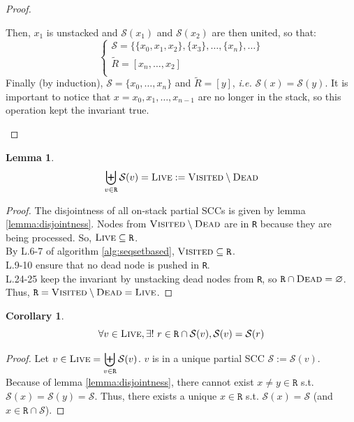 \documentclass[a4 paper, 12pt]{article}
\newtheorem{lemma}{Lemma}
\newtheorem{corollary}{Corollary}[lemma]
\begin{document}
\begin{proof}
\begin{itemize}
        Then, $x_1$ is unstacked and $\mathcal{S}(x_1)$ and $\mathcal{S}(x_2)$ are then united, so that:
        \begin{equation*}
            \left\{
                    \begin{array}{l}
                        \mathcal{S} = \{\{x_0, x_1, x_2\}, \{x_3\}, \ldots, \{x_n\}, \ldots\}\\
                        \widetilde{R} = [x_n, \ldots, x_2]\\
                    \end{array}
                \right.
        \end{equation*}
        Finally (by induction), $\mathcal{S} = \{x_0, \ldots, x_n\}$ and $\widetilde{R} = [y]$, \textit{i.e.} $\mathcal{S}(x)=\mathcal{S}(y)$. It is important to notice that $x=x_0, x_1, \ldots, x_{n-1}$ are no longer in the stack, so this operation kept the invariant true.
    \end{itemize}
\end{proof}

\begin{lemma}
    \begin{equation*}
        \biguplus_{v \in \texttt{R}} \mathcal{S}(v) = \textsc{Live} := \textsc{Visited} \setminus \textsc{Dead}
    \end{equation*}
\end{lemma}

\begin{proof}
    The disjointness of all on-stack partial SCCs is given by lemma \ref{lemma:disjointness}. Nodes from $\textsc{Visited} \setminus \textsc{Dead}$ are in \texttt{R} because they are being processed. So, $\textsc{Live} \subseteq \texttt{R}$.\\
    By L.6-7 of algorithm \ref{alg:seqsetbased}, $\textsc{Visited} \subseteq \texttt{R}$.\\
    L.9-10 ensure that no dead node is pushed in \texttt{R}.\\
    L.24-25 keep the invariant by unstacking dead nodes from \texttt{R}, so $\texttt{R} \cap \textsc{Dead} = \varnothing$. Thus, $\texttt{R} = \textsc{Visited} \setminus \textsc{Dead} = \textsc{Live}$.
\end{proof}

\begin{corollary}\label{cor:cor1}
    \begin{equation*}
        \forall v \in \textsc{Live}, \exists!~r \in \texttt{R} \cap \mathcal{S}(v), \mathcal{S}(v) = \mathcal{S}(r)
    \end{equation*}
\end{corollary}
\begin{proof}
    Let $v \in \textsc{Live} = \displaystyle{\biguplus_{v \in \texttt{R}} \mathcal{S}(v)}$. $v$ is in a unique partial SCC $\mathscr{S} := \mathcal{S}(v)$. Because of lemma \ref{lemma:disjointness}, there cannot exist $x \neq y \in \texttt{R}$ s.t. $\mathcal{S}(x) = \mathcal{S}(y) = \mathscr{S}$. Thus, there exists a unique $x \in \texttt{R}$ s.t. $\mathcal{S}(x) = \mathscr{S}$ (and $x\in \texttt{R} \cap \mathscr{S}$).
\end{proof}
\end{document}
